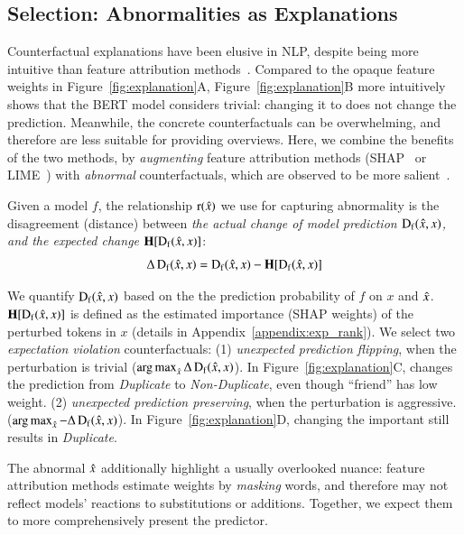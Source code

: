\subsection{Selection: Abnormalities as Explanations}
\label{subsec:local_explain}


Counterfactual explanations have been elusive in NLP, despite being more intuitive than feature attribution methods~\cite{miller}.
Compared to the opaque feature weights in Figure~\ref{fig:explanation}A, Figure~\ref{fig:explanation}B more intuitively shows that the BERT \qqp model considers  trivial: 
changing it to  does not change the prediction.
Meanwhile, the concrete counterfactuals can be overwhelming, and therefore are less suitable for providing overviews.
Here, we combine the benefits of the two methods, by \emph{augmenting} feature attribution methods (\eg SHAP~\cite{NIPS2017_7062} or LIME~\cite{Ribeiro2016WhySI}) with \emph{abnormal} counterfactuals, which are observed to be more salient~\cite{miller}.

Given a model $f$, the relationship $\operatorname*{r}(\hat{x})$ we use for capturing abnormality is the disagreement (distance) between \emph{the actual change of model prediction $\operatorname*{D_f}(\hat{x}, x)$, and the expected change $\operatorname*{\mathbf{H}}[\operatorname*{D_f}(\hat{x}, x)]$}:
$$\Delta\operatorname*{D_f}(\hat{x}, x) = \operatorname*{D_f}(\hat{x}, x)-\operatorname*{\mathbf{H}}[\operatorname*{D_f}(\hat{x}, x)]$$

We quantify $\operatorname*{D_f}(\hat{x}, x)$ based on the the prediction probability of $f$ on $x$ and $\hat{x}$.
$\operatorname*{\mathbf{H}}[\operatorname*{D_f}(\hat{x}, x)]$ is defined as the estimated importance (SHAP weights) of the perturbed tokens in $x$ (details in Appendix~\ref{appendix:exp_rank}).
We select two \emph{expectation violation} counterfactuals: %
(1) \emph{unexpected prediction flipping}, when the perturbation is trivial ($\operatorname*{arg\,max}_{\hat{x}} \Delta\operatorname*{D_f}(\hat{x}, x)$).
In Figure~\ref{fig:explanation}C,  changes the prediction from \emph{Duplicate} to \emph{Non-Duplicate}, even though ``friend'' has low weight.
(2) \emph{unexpected prediction preserving}, when the perturbation is aggressive. ($\operatorname*{arg\,max}_{\hat{x}} -\Delta\operatorname*{D_f}(\hat{x}, x)$).
In Figure~\ref{fig:explanation}D, changing the important  still results in \emph{Duplicate}.

The abnormal $\hat{x}$ additionally highlight a usually overlooked nuance: feature attribution methods estimate weights by \emph{masking} words, and therefore may not reflect models' reactions to substitutions or additions.
Together, we expect them to more comprehensively present the predictor.

